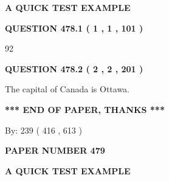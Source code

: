 \documentclass[12pt]{article}
\begin{document}
   
   
   
 \vspace{0.2in}
{\LARGE {\textbf{ A QUICK TEST EXAMPLE}}}
   
   
  
\vspace{0.2in}
  
{\textbf{\Large{QUESTION
478.1 
 ( 1 , 1 , 101 )
}}}
  
  
 
 
\noindent{}

92
 
 
  
\vspace{0.2in}
  
{\textbf{\Large{QUESTION
478.2 
 ( 2 , 2 , 201 )
}}}
  
  
 
 
\noindent{}
 
 
The capital of Canada is Ottawa.
 
 
 
 
   
   
 \vspace{0.2in}
 
   
   
   
   
\vspace{1.0in} 
{\textbf{\large{ *** END OF PAPER, THANKS *** }}} 
   
   
\hspace{1.0in} By: 
 239 ( 416 ,  613 )
   
   
   
   
\newpage 
\setcounter{page}{ 
   479001 } 
   
   
   
   
 {\textbf{ \Large{ PAPER NUMBER  479  }}}
   
   
\vspace{0.2in}
   
   
   
   
   
   
 \vspace{0.2in}
{\LARGE {\textbf{ A QUICK TEST EXAMPLE}}}
   
   
  
\vspace{0.2in}
  
\end{document}
